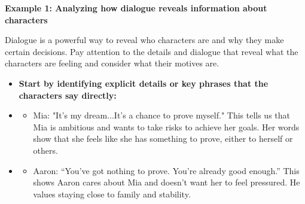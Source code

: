 \documentclass[12pt]{article}
\begin{document}
\begin{tcolorbox}[colframe=black!60, colback=white, 
coltitle=black, colbacktitle=black!15, fonttitle=\bfseries\Large, 
title=Examples, halign title=center, left=10pt, right=10pt, top=10pt, bottom=15pt]

\textbf{Example 1: Analyzing how dialogue reveals information about characters}


Dialogue is a powerful way to reveal who characters are and why they make certain decisions. Pay attention to the details and dialogue that reveal what the characters are feeling and consider what their motives are.

\begin{itemize}
    \item \textbf{Start by identifying explicit details or key phrases that the characters say directly:}
\end{itemize}
    \begin{itemize} \item
            \begin{itemize}
                \item Mia: "It's my dream...It's a chance to prove myself." This tells us that Mia is ambitious and wants to take risks to achieve her goals. Her words show that she feels like she has something to prove, either to herself or others.
            \end{itemize}
        \end{itemize}
        \begin{itemize}
           \item 
           \begin{itemize}
                \item Aaron: “You’ve got nothing to prove. You’re already good enough.” This shows Aaron cares about Mia and doesn’t want her to feel pressured. He values staying close to family and stability.
            \end{itemize}
        \end{itemize}
    

\end{tcolorbox}
\end{document}
